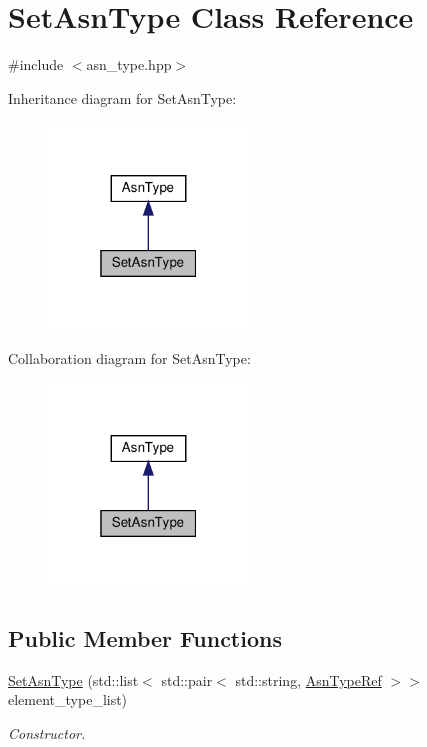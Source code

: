 \hypertarget{classSetAsnType}{}\section{Set\+Asn\+Type Class Reference}
\label{classSetAsnType}


{\ttfamily \#include $<$asn\+\_\+type.\+hpp$>$}



Inheritance diagram for Set\+Asn\+Type\+:
\nopagebreak
\begin{figure}[H]
\begin{center}
\leavevmode
\includegraphics[width=151pt]{d2/de1/classSetAsnType__inherit__graph}
\end{center}
\end{figure}


Collaboration diagram for Set\+Asn\+Type\+:
\nopagebreak
\begin{figure}[H]
\begin{center}
\leavevmode
\includegraphics[width=151pt]{d3/d74/classSetAsnType__coll__graph}
\end{center}
\end{figure}
\subsection*{Public Member Functions}
\begin{DoxyCompactItemize}
\item 
\hyperlink{classSetAsnType_a6b9b1a9a2ca78fbdcf02bc60c7107d1f}{Set\+Asn\+Type} (std\+::list$<$ std\+::pair$<$ std\+::string, \hyperlink{asn__type_8hpp_a456d7cf50c15d087cc0428ae80834b35}{Asn\+Type\+Ref} $>$$>$ element\+\_\+type\+\_\+list)
\begin{DoxyCompactList}\small\item\em Constructor. \end{DoxyCompactList}\end{DoxyCompactItemize}
